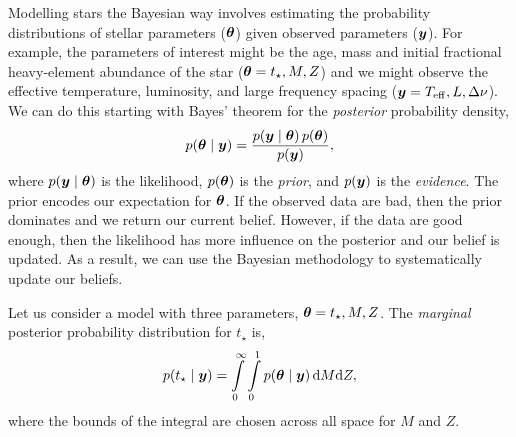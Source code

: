 




Modelling stars the Bayesian way involves estimating the probability distributions of stellar parameters (\(\bm{\theta}\)) given observed parameters (\(\bm{y}\)). For example, the parameters of interest might be the age, mass and initial fractional heavy-element abundance of the star (\(\bm{\theta} = t_\star, M, Z\)) and we might observe the effective temperature, luminosity, and large frequency spacing (\(\bm{y} = {T_\mathrm{eff}}, L, \Delta\nu\)). We can do this starting with Bayes' theorem for the \emph{posterior} probability density,
%
\begin{equation}
    p(\bm{\theta} \mid \bm{y}) = \frac{p(\bm{y} \mid \bm{\theta})\,p(\bm{\theta})}{p(\bm{y})},
\end{equation}
%
where \(p(\bm{y} \mid \bm{\theta})\) is the likelihood, \(p(\bm{\theta})\) is the \emph{prior}, and \(p(\bm{y})\) is the \emph{evidence}. The prior encodes our expectation for \(\bm{\theta}\). If the observed data are bad, then the prior dominates and we return our current belief. However, if the data are good enough, then the likelihood has more influence on the posterior and our belief is updated. As a result, we can use the Bayesian methodology to systematically update our beliefs. 

Let us consider a model with three parameters, \(\bm{\theta} = t_\star, M, Z\). The \emph{marginal} posterior probability distribution for \(t_\star\) is,
%
\begin{equation}
    p(t_\star \mid \bm{y}) = \int\limits_0^\infty \int\limits_0^1 p(\bm{\theta} \mid \bm{y}) \, \mathrm{d} M \mathrm{d} Z,
\end{equation}
%
where the bounds of the integral are chosen across all space for \(M\) and \(Z\).

